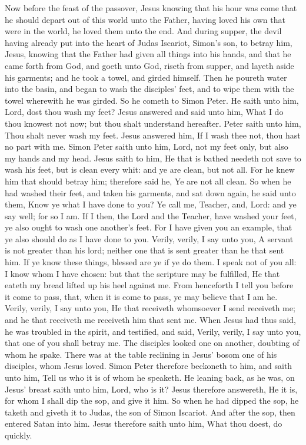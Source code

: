 Now before the feast of the passover, Jesus knowing that his hour was come that he should depart out of this world unto the Father, having loved his own that were in the world, he loved them unto the end. And during supper, the devil having already put into the heart of Judas Iscariot, Simon’s son, to betray him, Jesus, knowing that the Father had given all things into his hands, and that he came forth from God, and goeth unto God, riseth from supper, and layeth aside his garments; and he took a towel, and girded himself. Then he poureth water into the basin, and began to wash the disciples’ feet, and to wipe them with the towel wherewith he was girded. So he cometh to Simon Peter. He saith unto him, Lord, dost thou wash my feet? Jesus answered and said unto him, What I do thou knowest not now; but thou shalt understand hereafter. Peter saith unto him, Thou shalt never wash my feet. Jesus answered him, If I wash thee not, thou hast no part with me. Simon Peter saith unto him, Lord, not my feet only, but also my hands and my head. Jesus saith to him, He that is bathed needeth not save to wash his feet, but is clean every whit: and ye are clean, but not all. For he knew him that should betray him; therefore said he, Ye are not all clean.  So when he had washed their feet, and taken his garments, and sat down again, he said unto them, Know ye what I have done to you? Ye call me, Teacher, and, Lord: and ye say well; for so I am. If I then, the Lord and the Teacher, have washed your feet, ye also ought to wash one another’s feet. For I have given you an example, that ye also should do as I have done to you. Verily, verily, I say unto you, A servant is not greater than his lord; neither one that is sent greater than he that sent him. If ye know these things, blessed are ye if ye do them. I speak not of you all: I know whom I have chosen: but that the scripture may be fulfilled, He that eateth my bread lifted up his heel against me. From henceforth I tell you before it come to pass, that, when it is come to pass, ye may believe that I am he. Verily, verily, I say unto you, He that receiveth whomsoever I send receiveth me; and he that receiveth me receiveth him that sent me.  When Jesus had thus said, he was troubled in the spirit, and testified, and said, Verily, verily, I say unto you, that one of you shall betray me. The disciples looked one on another, doubting of whom he spake. There was at the table reclining in Jesus’ bosom one of his disciples, whom Jesus loved. Simon Peter therefore beckoneth to him, and saith unto him, Tell us who it is of whom he speaketh. He leaning back, as he was, on Jesus’ breast saith unto him, Lord, who is it? Jesus therefore answereth, He it is, for whom I shall dip the sop, and give it him. So when he had dipped the sop, he taketh and giveth it to Judas, the son of Simon Iscariot. And after the sop, then entered Satan into him. Jesus therefore saith unto him, What thou doest, do quickly. 